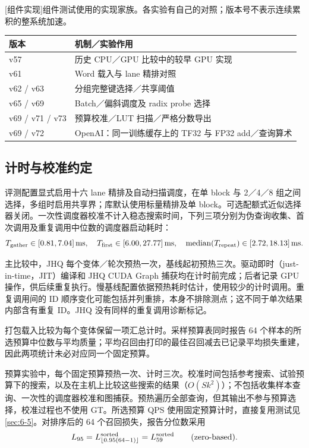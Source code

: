 \par\medskip\noindent\begin{minipage}{\linewidth}
\centering
\captionsetup{hypcap=false}
[组件实现]{组件测试使用的实现家族。各实验有自己的对照；版本号不表示连续累积的整系统加速。}
\label{tab:a-components}
\small\setlength{\tabcolsep}{4pt}
\begin{tabularx}{\linewidth}{@{}l>{\raggedright\arraybackslash}X@{}}
\toprule
版本 & 机制／实验作用\\\midrule
v57 & 历史 CPU／GPU 比较中的较早 GPU 实现\\
v61 & Word 载入与 lane 精排对照\\
v62 / v63 & 分组完整键选择／共享阈值\\
v65 / v69 & Batch／偏斜调度及 radix probe 选择\\
v69 / v71 / v73 & 预算校准／LUT 扫描／严格分数导出\\
v69 / v72 & OpenAI：同一训练缓存上的 TF32 与 FP32 add／查询算术\\
\bottomrule
\end{tabularx}
\end{minipage}\par\medskip

\subsection{计时与校准约定}
\label{sec:a-e1-protocol}
评测配置显式启用十六 lane 精排及自动扫描调度，在单 block 与 2／4／8 组之间选择，多组时启用共享界；库默认使用标量精排及单 block。可选配额式近似选择器关闭。一次性调度器校准不计入稳态搜索时间，下列三项分别为伪查询收集、首次调用及重复调用中位数的调度器启动耗时：
\[
 T_{\rm gather}\in[0.81,7.04]\,\mathrm{ms},\quad
 T_{\rm first}\in[6.00,27.77]\,\mathrm{ms},\quad
 \operatorname{median}(T_{\rm repeat})\in[2.72,18.13]\,\mathrm{ms}.
\]

主比较中，JHQ 每个变体／轮次预热一次，基线起初预热三次。驱动即时（just-in-time，JIT）编译和 JHQ CUDA Graph 捕获均在计时前完成；后者记录 GPU 操作，供后续重复执行。慢基线配置依据预热耗时估计，使用较少的计时调用。重复调用间的 ID 顺序变化可能包括并列重排，本身不排除测点；这不同于单次结果内部含有重复 ID。JHQ 没有同样的重复调用诊断标记。

打包载入比较为每个变体保留一项汇总计时。采样预算表同时报告 64 个样本的所选预算中位数与平均质量；平均召回由打印的最佳召回减去已记录平均损失重建，因此两项统计未必对应同一个固定预算。

\label{sec:a-budget-contract}
\label{sec:a-supplement}
\label{sec:a-t4-t5}
预算实验中，每个固定预算预热一次、计时三次。校准时间包括参考搜索、试验预算下的搜索，以及在主机上比较这些搜索的结果（$O(Sk^2)$）；不包括收集样本查询、一次性的调度器校准和图捕获。预热遍历全部查询，但其输出不参与预算选择，校准过程也不使用 GT。所选预算 QPS 使用固定预算计时，直接复用测试见 \cref{sec:6-5}。对排序后的 64 个召回损失，报告分位数采用
\[
 L_{95}=L^{\rm sorted}_{\lfloor0.95(64-1)\rfloor}
       =L^{\rm sorted}_{59}\qquad\text{(zero-based)}.
\]
